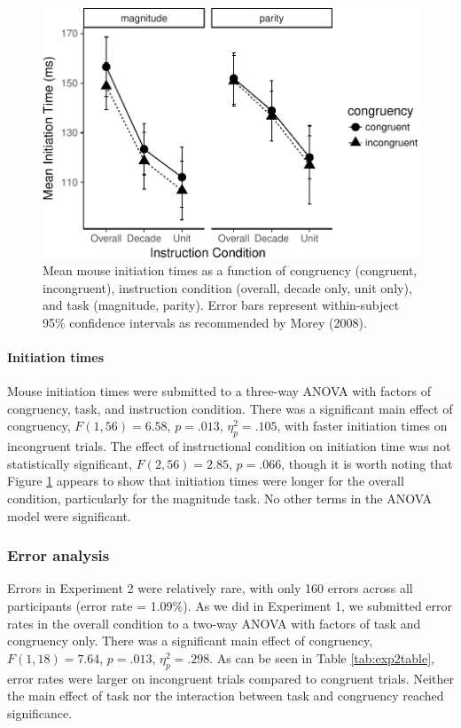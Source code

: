 \documentclass[english,man]{apa6}
\theoremstyle{definition}
\theoremstyle{definition}
\theoremstyle{definition}
\theoremstyle{remark}
\begin{document}
\begin{figure}
\centering
\includegraphics{paper_files/figure-latex/exp2-init-1.pdf}
\caption{\label{fig:exp2-init}Mean mouse initiation times as a function of
congruency (congruent, incongruent), instruction condition (overall,
decade only, unit only), and task (magnitude, parity). Error bars
represent within-subject 95\% confidence intervals as recommended by
Morey (2008).}
\end{figure}

\paragraph{Initiation times}\label{initiation-times}

Mouse initiation times were submitted to a three-way ANOVA with factors
of congruency, task, and instruction condition. There was a significant
main effect of congruency, \(F(1, 56) = 6.58\), \(p = .013\),
\(\eta^2_p = .105\), with faster initiation times on incongruent trials.
The effect of instructional condition on initiation time was not
statistically significant, \(F(2, 56) = 2.85\), \(p = .066\), though it
is worth noting that Figure \ref{fig:exp2-init} appears to show that
initiation times were longer for the overall condition, particularly for
the magnitude task. No other terms in the ANOVA model were significant.

\subsubsection{Error analysis}\label{error-analysis-1}

Errors in Experiment 2 were relatively rare, with only 160 errors across
all participants (error rate = 1.09\%). As we did in Experiment 1, we
submitted error rates in the overall condition to a two-way ANOVA with
factors of task and congruency only. There was a significant main effect
of congruency, \(F(1, 18) = 7.64\), \(p = .013\), \(\eta^2_p = .298\).
As can be seen in Table \ref{tab:exp2table}, error rates were larger on
incongruent trials compared to congruent trials. Neither the main effect
of task nor the interaction between task and congruency reached
significance.
\end{document}
